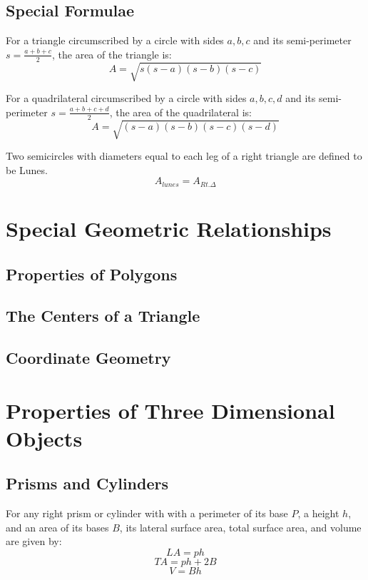 \documentclass[final, letterpaper, 12pt]{article}
\begin{document}
	\subsection{Special Formulae}\label{sec: Heron's and Brahmagupta's Formulae, Lunes}
	
		For a triangle circumscribed by a circle with sides $a, b, c$ and its semi-perimeter $s = \frac{a+b+c}{2}$, the area of the triangle is:
		\begin{equation}
			A = \sqrt{s(s-a)(s-b)(s-c)}
		\end{equation}
		
		For a quadrilateral circumscribed by a circle with sides $a, b, c, d$ and its semi-perimeter $s = \frac{a+b+c+d}{2}$, the area of the quadrilateral is:
		\begin{equation}
			A = \sqrt{(s-a)(s-b)(s-c)(s-d)}
		\end{equation}
		
		Two semicircles with diameters equal to each leg of a right triangle are defined to be Lunes.
		\begin{equation}
			A_{lunes} = A_{Rt.\Delta}
		\end{equation}
\section{Special Geometric Relationships}
	\subsection{Properties of Polygons}\label{sec: information about angles, diagonals, and other aspects of polygons}
	\subsection{The Centers of a Triangle}\label{sec: looking at the centroid, orthocenter, circumcenter, and incenter of a triangle}
	\subsection{Coordinate Geometry}\label{sec: ways of working with coordinates... in geometry}
\section{Properties of Three Dimensional Objects}
	\subsection{Prisms and Cylinders}\label{sec: simple formulae for the more simple objects}
		For any right prism or cylinder with with a perimeter of its base $P$, a height $h$, and an area of its bases $B$, its lateral surface area, total surface area, and volume are given by:
		\begin{equation}
			LA = ph
		\end{equation}
		\begin{equation}
			TA = ph+2B
		\end{equation}
		\begin{equation}
			V = Bh
		\end{equation}
\end{document}
